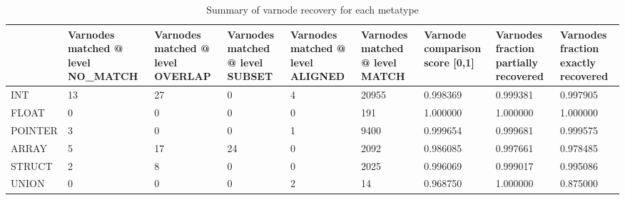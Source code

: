 \begin{table}[t]
\centering
\caption{Summary of varnode recovery for each metatype}
\label{table:metatype-recovery-summary-with-levels}
\begin{tabular}{lp{2.2cm}p{2.2cm}p{2.2cm}p{2.2cm}p{2.2cm}p{2.2cm}p{2.2cm}p{2.2cm}}
\toprule
{} &  Varnodes matched @ level NO\_MATCH &  Varnodes matched @ level OVERLAP &  Varnodes matched @ level SUBSET &  Varnodes matched @ level ALIGNED &  Varnodes matched @ level MATCH &  Varnode comparison score [0,1] &  Varnodes fraction partially recovered &  Varnodes fraction exactly recovered \\
\midrule
INT     &                                 13 &                                27 &                                0 &                                 4 &                           20955 &                        0.998369 &                               0.999381 &                             0.997905 \\
FLOAT   &                                  0 &                                 0 &                                0 &                                 0 &                             191 &                        1.000000 &                               1.000000 &                             1.000000 \\
POINTER &                                  3 &                                 0 &                                0 &                                 1 &                            9400 &                        0.999654 &                               0.999681 &                             0.999575 \\
ARRAY   &                                  5 &                                17 &                               24 &                                 0 &                            2092 &                        0.986085 &                               0.997661 &                             0.978485 \\
STRUCT  &                                  2 &                                 8 &                                0 &                                 0 &                            2025 &                        0.996069 &                               0.999017 &                             0.995086 \\
UNION   &                                  0 &                                 0 &                                0 &                                 2 &                              14 &                        0.968750 &                               1.000000 &                             0.875000 \\
\bottomrule
\end{tabular}
\end{table}

